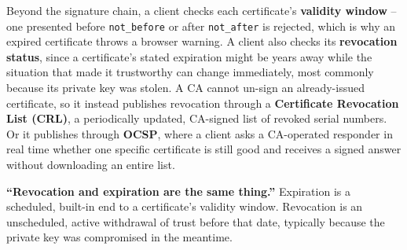 Beyond the signature chain, a client checks each certificate's \textbf{validity window} -- one
presented before \texttt{not\_before} or after \texttt{not\_after} is rejected, which is why an
expired certificate throws a browser warning. A client also checks its \textbf{revocation status},
since a certificate's stated expiration might be years away while the situation that made it
trustworthy can change immediately, most commonly because its private key was stolen. A CA cannot
un-sign an already-issued certificate, so it instead publishes revocation through a \textbf{Certificate
Revocation List (CRL)}, a periodically updated, CA-signed list of revoked serial numbers. Or it
publishes through \textbf{OCSP}, where a client asks a CA-operated responder in real time whether one
specific certificate is still good and receives a signed answer without downloading an entire list.

\begin{misconception}
\textbf{``Revocation and expiration are the same thing.''} Expiration is a scheduled, built-in end
to a certificate's validity window. Revocation is an unscheduled, active withdrawal of trust before
that date, typically because the private key was compromised in the meantime.
\end{misconception}


